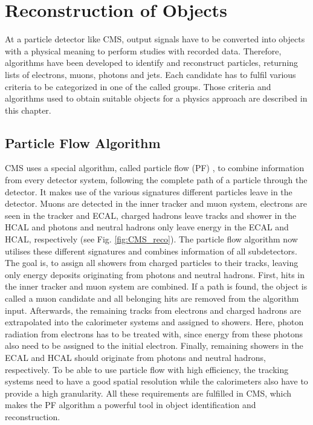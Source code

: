 \chapter{Reconstruction of Objects}
\label{ch:Reco}
	At a particle detector like CMS, output signals have to be converted into objects with a physical meaning to perform studies with recorded data. Therefore, algorithms have been developed to identify and reconstruct particles, returning lists of electrons, muons, photons and jets. Each candidate has to fulfil various criteria to be categorized in one of the called groups. Those criteria and algorithms used to obtain suitable objects for a physics approach are described in this chapter.

\section{Particle Flow Algorithm}
\label{sec:pf}
	CMS uses a special algorithm, called particle flow (PF) \cite{particleflow}, to combine information from every detector system, following the complete path of a particle through the detector. It makes use of the various signatures different particles leave in the detector. Muons are detected in the inner tracker and muon system, electrons are seen in the tracker and ECAL, charged hadrons leave tracks and shower in the HCAL and photons and neutral hadrons only leave energy in the ECAL and HCAL, respectively (see Fig. \ref{fig:CMS_reco}). The particle flow algorithm now utilises these different signatures and combines information of all subdetectors. The goal is, to assign all showers from charged particles to their tracks, leaving only energy deposits originating from photons and neutral hadrons. First, hits in the inner tracker and muon system are combined. If a path is found, the object is called a muon candidate and all belonging hits are removed from the algorithm input. Afterwards, the remaining tracks from electrons and charged hadrons are extrapolated into the calorimeter systems and assigned to showers. Here, photon radiation from electrons has to be treated with, since energy from these photons also need to be assigned to the initial electron. Finally, remaining showers in the ECAL and HCAL should originate from photons and neutral hadrons, respectively. To be able to use particle flow with high efficiency, the tracking systems need to have a good spatial resolution while the calorimeters also have to provide a high granularity. All these requirements are fulfilled in CMS, which makes the PF algorithm a powerful tool in object identification and reconstruction.

